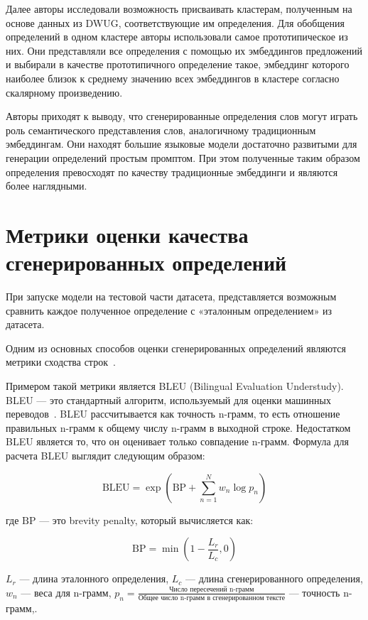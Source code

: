 \documentclass[LI,VKR]{HSEUniversity}
\begin{document}
Далее авторы исследовали возможность присваивать кластерам, полученным на основе данных из DWUG,
соответствующие им определения.
Для обобщения определений в одном кластере авторы использовали самое прототипическое из них.
Они представляли все определения с помощью их эмбеддингов предложений и выбирали в качестве
прототипичного определение такое, эмбеддинг которого наиболее близок к среднему значению всех
эмбеддингов в кластере согласно скалярному произведению.

Авторы приходят к выводу, что сгенерированные определения слов могут играть роль
семантического представления слов, аналогичному традиционным эмбеддингам.
Они находят большие языковые модели достаточно развитыми для генерации определений
простым промптом.
При этом полученные таким образом определения превосходят по качеству
традиционные эмбеддинги и являются более наглядными.

\section{Метрики оценки качества сгенерированных определений}

При запуске модели на тестовой части датасета,
представляется возможным сравнить каждое полученное определение с «эталонным определением» из датасета.

Одним из основных способов оценки сгенерированных определений являются метрики
сходства строк~\cite{DefinitionModelingReviewAndDatasetAnalysis}.

Примером такой метрики является BLEU (Bilingual Evaluation Understudy).
BLEU — это стандартный алгоритм, используемый для оценки машинных переводов~\cite{BLUE}.
BLEU рассчитывается как точность n-грамм, то есть отношение правильных n-грамм к общему числу n-грамм в выходной строке.
Недостатком BLEU является то, что он оценивает только совпадение n-грамм.
Формула для расчета BLEU выглядит следующим образом:

\[
\text{BLEU} = \exp \left( \text{BP} + \sum_{n=1}^{N} w_n \log p_n \right)
\]

где \(\text{BP}\) — это brevity penalty, который вычисляется как:

\[
\text{BP} = \min\left(1 - \frac{L_r}{L_c}, 0 \right)
\]

\(L_r\) — длина эталонного определения,
\(L_c\) — длина сгенерированного определения,
\(w_n\) — веса для n-грамм,
\(p_n = \frac{\text{Число пересечений n-грамм}}{\text{Общее число n-грамм в сгенерированном тексте}}\) — точность n-грамм,.
\end{document}
